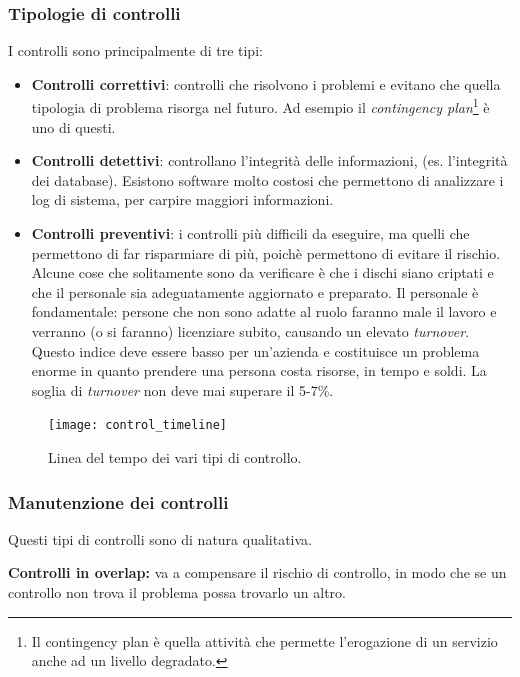 \subsubsection{Tipologie di controlli}

I controlli sono principalmente di tre tipi:

\begin{itemize}
\item \textbf{Controlli correttivi}: controlli che risolvono i problemi e
evitano che quella tipologia di problema risorga nel futuro. Ad esempio il
\textit{contingency plan}\footnote{Il contingency plan è quella
attività che permette l'erogazione di un servizio anche ad un livello
degradato.} è uno di questi.

\item \textbf{Controlli detettivi}: controllano l'integrità delle
informazioni, (es. l'integrità dei database). Esistono software
molto costosi che permettono di analizzare i log di sistema, per carpire
maggiori informazioni.

\item \textbf{Controlli preventivi}: i controlli più difficili da eseguire, ma
quelli che permettono di far risparmiare di più, poichè permettono di evitare
il rischio. Alcune cose che solitamente sono da verificare è che i dischi siano 
criptati e che il personale sia adeguatamente aggiornato e preparato.
Il personale è fondamentale: persone che non sono adatte al ruolo faranno male
il lavoro e verranno (o si faranno) licenziare subito, causando un
elevato \textit{turnover}. Questo indice deve essere basso per un'azienda e
costituisce un problema enorme in quanto prendere una persona costa risorse, in
tempo e soldi. La soglia di \textit{turnover} non deve mai superare il 5-7\%.
\end{itemize}

\begin{figure}[H]
	\begin{center}
\texttt{[image: control\_timeline]}
	\end{center}
	\caption{Linea del tempo dei vari tipi di controllo.}
\end{figure}


\subsubsection{Manutenzione dei controlli}

Questi tipi di controlli sono di natura qualitativa.

\textbf{Controlli in overlap:} va a compensare il rischio di controllo, in modo
che se un controllo non trova il problema possa trovarlo un altro.

